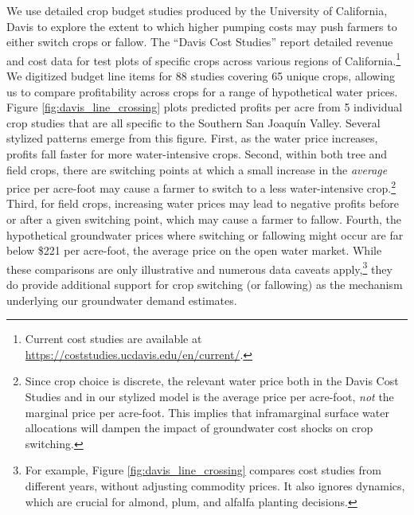 We use detailed crop budget studies produced by the University of California, Davis to explore the extent to which higher pumping costs may push farmers to either switch crops or fallow. The ``Davis Cost Studies'' report detailed revenue and cost data for test plots of specific crops across various regions of California.\footnote{Current cost studies are available at \url{https://coststudies.ucdavis.edu/en/current/}.}
We digitized budget line items for 88 studies covering 65 unique crops, allowing us to compare profitability across crops for a range of hypothetical water prices. Figure \ref{fig:davis_line_crossing} plots predicted profits per acre from 5 individual crop studies that are all specific to the Southern San Joaqu\'{i}n Valley. Several stylized patterns emerge from this figure. First, as the water price increases, profits fall faster for more water-intensive crops. Second, within both tree and field crops, there are switching points at which a small increase in the \emph{average} price per acre-foot may cause a farmer to switch to a less water-intensive crop.\footnote{
Since crop choice is discrete, the relevant water price both in the Davis Cost Studies and in our stylized model is the average price per acre-foot, \emph{not} the marginal price per acre-foot. This implies that inframarginal surface water allocations will dampen the impact of groundwater cost shocks on crop switching.
}
Third, for field crops, increasing water prices may lead to negative profits before or after a given switching point, which may cause a farmer to fallow. Fourth, the hypothetical groundwater prices where switching or fallowing might occur are far below \$221 per acre-foot, the average price on the open water market. While these comparisons are only illustrative and numerous data caveats apply,\footnote{For example, Figure \ref{fig:davis_line_crossing} compares cost studies from different years, without adjusting commodity prices. It also ignores dynamics, which are crucial for almond, plum, and alfalfa planting decisions.} they do provide additional support for crop switching (or fallowing) as the mechanism underlying our groundwater demand estimates.

